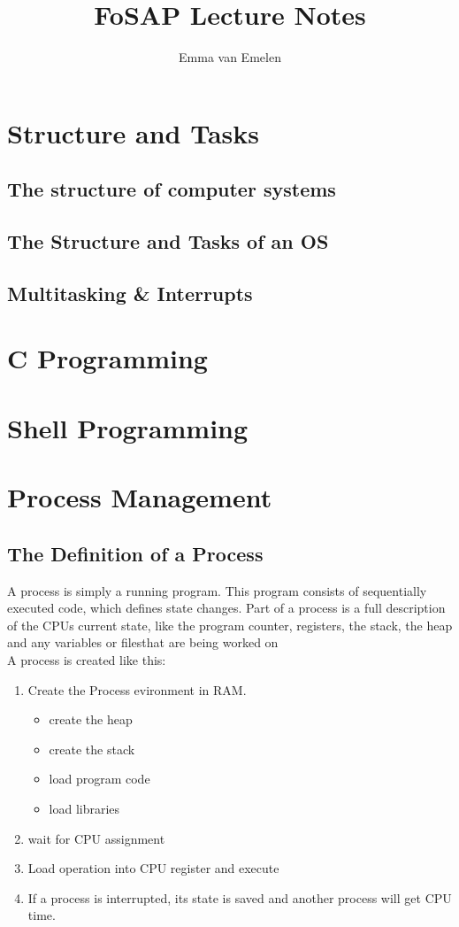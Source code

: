 \documentclass[a4paper, 11pt]{article}
\author{Emma van Emelen}
\title{FoSAP Lecture Notes}
\begin{document}
    \maketitle
    \newpage

    \tableofcontents
    \newpage

    \section{Structure and Tasks}
    \subsection{The structure of computer systems}
    \subsection{The Structure and Tasks of an OS}
    \subsection{Multitasking \& Interrupts}

    \section{C Programming}
    \section{Shell Programming}
    \section{Process Management}
    \subsection{The Definition of a Process}
    A process is simply a running program. This program consists of sequentially executed code, which defines state changes.
    Part of a process is a full description of the CPUs current state, like the program counter, registers, the stack, 
    the heap and any variables or filesthat are being worked on\\
    A process is created like this:
    \begin{enumerate}
      \item Create the Process evironment in RAM.
      \begin{itemize}
        \item create the heap
        \item create the stack
        \item load program code
        \item load libraries
      \end{itemize} 
      \item wait for CPU assignment
      \item Load operation into CPU register and execute
      \item If a process is interrupted, its state is saved and another process will get CPU time.
    \end{enumerate}
\end{document}
